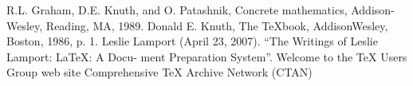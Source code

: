 \begin{thebibliography}{9}
\bibitem{} R.L. Graham, D.E. Knuth, and O. Patashnik, Concrete mathematics, Addison-Wesley, Reading, MA, 1989.
\bibitem{} Donald E. Knuth, The TeXbook, AddisonWesley, Boston, 1986, p. 1.
\bibitem{} Leslie Lamport (April 23, 2007). “The Writings of Leslie Lamport: LaTeX: A Docu-
ment Preparation System”.
\bibitem{} Welcome to the TeX Users Group web site
\bibitem{} Comprehensive TeX Archive Network (CTAN)
\end{thebibliography}
